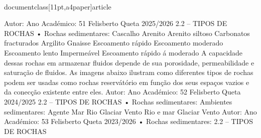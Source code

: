 \\documentclass[11pt,a4paper]{article}
\begin{document}
Autor:
Ano Académico:
51
Felisberto Queta
2025/2026
2.2 – TIPOS DE ROCHAS
• Rochas sedimentares: 
Cascalho Arenito Arenito siltoso Carbonatos fracturados Argilito Gnaisse
Escoamento rápido Escoamento 
moderado
Escoamento 
lento
Impermeável
Escoamento 
rápido á moderado
A capacidade dessas rochas em armazenar fluidos depende de sua porosidade, permeabilidade e 
saturação de fluidos. 
As imagens abaixo ilustram como diferentes tipos de rochas podem ser usadas como rochas 
reservátório em função dos seus espaços vazios e da conecção existente entre eles.
Autor:
Ano Académico:
52
Felisberto Queta
2024/2025
2.2 – TIPOS DE ROCHAS
• Rochas sedimentares: 
Ambientes sedimentares: 
Agente
Mar
Rio
Glaciar
Vento
Rio e mar
Glaciar
Vento
Autor:
Ano Académico:
53
Felisberto Queta
2023/2026
• Rochas sedimentares: 
2.2 – TIPOS DE ROCHAS\
\end{document}

